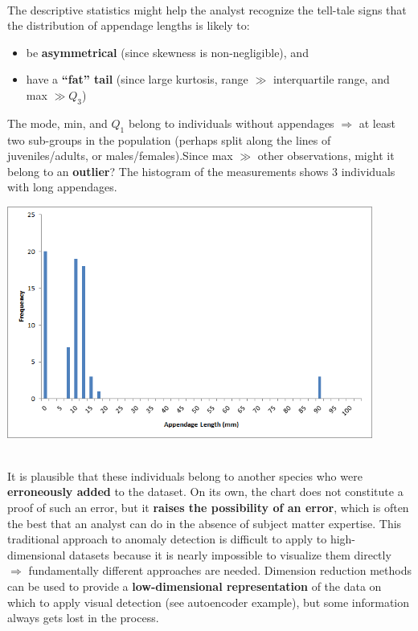 \documentclass[20pt,landscape,footrule,headrule]{foils}
\newcommand{\newl}{\newline\newline}
\begin{document}
\newpage\ \\ \noindent The descriptive statistics might help the analyst recognize the tell-tale signs that the distribution of appendage lengths is likely to: \begin{itemize}
\item be \textbf{asymmetrical} (since skewness is non-negligible), and
\item have a \textbf{``fat'' tail} (since large kurtosis, range $\gg$ interquartile range, and max $\gg Q_3$) \end{itemize} 
The mode, min, and $Q_1$ belong to individuals without appendages $\Longrightarrow$ at least two sub-groups in the population (perhaps split along the lines of juveniles/adults, or males/females).\newl Since max $\gg$ other observations, might it  belong to an \textbf{outlier}? The histogram of the measurements shows 3 individuals with long appendages.\newpage\ 
\begin{center} \includegraphics[width=0.9\textwidth]{Images/appendage_length_EN}
\end{center}  
\newpage \ \\ \noindent
It is plausible that these individuals belong to another species who were \textbf{erroneously added} to the dataset. \newl On its own, the chart does not constitute a proof of such an error, but it \textbf{raises the possibility of an error}, which is often the best that an analyst can do in the absence of subject matter expertise.
\newl This traditional approach to anomaly detection is difficult to apply to high-dimensional datasets because it is nearly impossible to visualize them directly $\Longrightarrow$ fundamentally different approaches are needed.\newl 
Dimension reduction methods can be used to provide a \textbf{low-dimensional representation} of the data on which to apply visual detection (see autoencoder example), but some information always gets lost in the process. 
\end{document}
